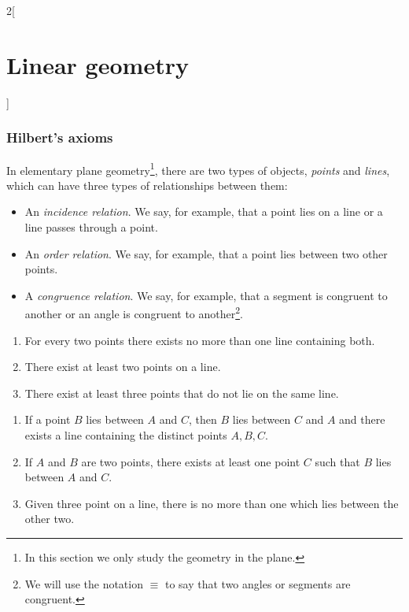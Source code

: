 \documentclass[../../../main.tex]{subfiles}
\begin{document}
\begin{multicols}{2}[\section{Linear geometry}]
    \subsubsection*{Hilbert's axioms}
    \begin{definition}
        In elementary plane geometry\footnote{In this section we only study the geometry in the plane.}, there are two types of objects, \textit{points} and \textit{lines}, which can have three types of relationships between them:
        \begin{itemize}
            \item An \textit{incidence relation}. We say, for example, that a point lies on a line or a line passes through a point.
            \item An \textit{order relation}. We say, for example, that a point lies between two other points.
            \item A \textit{congruence relation}. We say, for example, that a segment is congruent to another or an angle is congruent to another\footnote{We will use the notation $\equiv$ to say that two angles or segments are congruent.}.
        \end{itemize}
    \end{definition}
    \begin{axiom}
        \label{1}
        \hfill
        \begin{enumerate}
            \item For every two points there exists no more than one line containing both.
            \item There exist at least two points on a line.
            \item There exist at least three points that do not lie on the same line.
        \end{enumerate}
    \end{axiom}
    \begin{axiom}
        \label{2}
        \hfill
        \begin{enumerate}
            \item If a point $B$ lies between $A$ and $C$, then $B$ lies between $C$ and $A$ and there exists a line containing the distinct points $A,B,C$.
            \item If $A$ and $B$ are two points, there exists at least one point $C$ such that $B$ lies between $A$ and $C$.
            \item Given three point on a line, there is no more than one which lies between the other two.

\end{enumerate}
\end{axiom}
\end{multicols}
\end{document}
